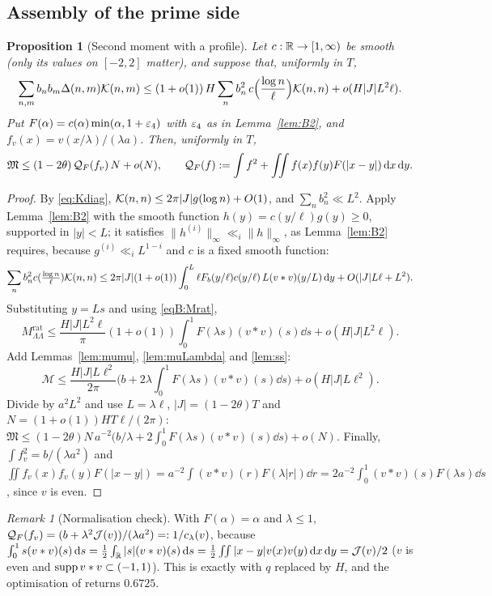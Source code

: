 \documentclass[11pt]{amsart}
\newtheorem{proposition}[theorem]{Proposition}
\theoremstyle{definition}
\theoremstyle{remark}
\newtheorem{remark}[theorem]{Remark}
\numberwithin{equation}{section}
\begin{document}
\subsection{Assembly of the prime side}\label{sec:primeassembly}
\begin{proposition}[Second moment with a profile]\label{prop:second}
Let $c:\mathbb R\to[1,\infty)$ be smooth (only its values on $[-2,2]$ matter), and suppose that, uniformly in $T$,
\begin{equation}\label{eq:profile}
\sum_{n,m}b_nb_m\Delta(n,m)\mathcal K(n,m)\le(1+o(1))\,H\sum_nb_n^2\,c\Big(\frac{\log n}\ell\Big)\mathcal K(n,n)+o(H|J|L^2\ell).
\end{equation}
Put $F(\alpha)=c(\alpha)\min(\alpha,1+\varepsilon_4)$ with $\varepsilon_4$ as in Lemma~\ref{lem:B2}, and $f_v(x)=v(x/\lambda)/(\lambda a)$. Then, uniformly in $T$,
\[
\mathfrak M\le(1-2\theta)\,\mathcal Q_F(f_v)\,N+o(N),\qquad\mathcal Q_F(f):=\int f^2+\iint f(x)f(y)F(|x-y|)\,\mathrm d x\,\mathrm d y .
\]
\end{proposition}
\begin{proof}
By \eqref{eq:Kdiag}, $\mathcal K(n,n)\le2\pi|J|g(\log n)+O(1)$, and $\sum_nb_n^2\ll L^2$. Apply Lemma~\ref{lem:B2} with the smooth function $h(y)=c(y/\ell)g(y)\ge0$, supported in $|y|<L$; it satisfies $\|h^{(i)}\|_\infty\ll_i\|h\|_\infty$, as Lemma~\ref{lem:B2} requires, because $g^{(i)}\ll_iL^{1-i}$ and $c$ is a fixed smooth function:
\[
\sum_nb_n^2c(\tfrac{\log n}\ell)\mathcal K(n,n)\le2\pi|J|(1+o(1))\int_0^L\ell F_b(y/\ell)c(y/\ell)\,L(v*v)(y/L)\,\mathrm d y+O(|J|L\ell+L^2).
\]
Substituting $y=Ls$ and using \eqref{eqB:Mrat},
\[
M^{\mathrm{rat}}_{\Lambda\Lambda}\le\frac{H|J|L^2\ell}{\pi}(1+o(1))\int_0^1F(\lambda s)(v*v)(s)\dd s+o(H|J|L^2\ell).
\]
Add Lemmas~\ref{lem:mumu}, \ref{lem:muLambda} and \ref{lem:ss}:
\[
\mathcal M\le\frac{H|J|L\ell^2}{2\pi}\Big(b+2\lambda\int_0^1F(\lambda s)(v*v)(s)\dd s\Big)+o(H|J|L\ell^2).
\]
Divide by $a^2L^2$ and use $L=\lambda\ell$, $|J|=(1-2\theta)T$ and $N=(1+o(1))HT\ell/(2\pi)$:
$\mathfrak M\le(1-2\theta)N\,a^{-2}\big(b/\lambda+2\int_0^1F(\lambda s)(v*v)(s)\dd s\big)+o(N)$. Finally, $\int f_v^2=b/(\lambda a^2)$ and $\iint f_v(x)f_v(y)F(|x-y|)=a^{-2}\int(v*v)(r)F(\lambda|r|)\dd r=2a^{-2}\int_0^1(v*v)(s)F(\lambda s)\dd s$, since $v$ is even.
\end{proof}

\begin{remark}[Normalisation check]
With $F(\alpha)=\alpha$ and $\lambda\le1$, $\mathcal Q_F(f_v)=(b+\lambda^2\mathcal J(v))/(\lambda a^2)=:1/c_\lambda(v)$, because $\int_0^1s(v*v)(s)\,\mathrm d s=\frac12\int_\mathbb R|s|(v*v)(s)\,\mathrm d s=\frac12\iint|x-y|v(x)v(y)\,\mathrm d x\,\mathrm d y=\mathcal J(v)/2$ ($v$ is even and $\operatorname{supp} v*v\subset(-1,1)$). This is exactly \cite[Prop.~7.2]{HY26} with $q$ replaced by $H$, and the optimisation of \cite[\S11]{HY26} returns $0.6725$.
\end{remark}
\end{document}
